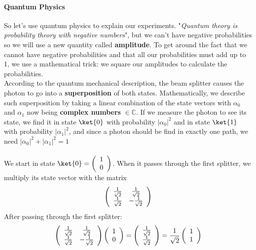 \documentclass[10pt]{report}
\begin{document}
\paragraph{Quantum Physics} So let's use quantum physics to explain our experiments. "\textit{Quantum theory is probability theory with negative numbers}", but we can't have negative probabilities so we will use a new quantity called \textbf{amplitude}. To get around the fact that we cannot have negative probabilities and that all our probabilities must add up to 1, we use a mathematical trick: we square our amplitudes to calculate the probabilities.\\
According to the quantum mechanical description, the beam splitter causes the photon to go into a \textbf{superposition} of both states. Mathematically, we describe such superposition by taking a linear combination of the state vectors with $\alpha_0$ and $\alpha_1$ now being \textbf{complex numbers} $\in \mathbb{C}$. If we measure the photon to see its state, we find it in state $\ket{0}$ with probability $|\alpha_0|^2$ and in state $\ket{1}$ with probability $|\alpha_1|^2$, and since a photon should be find in exactly one path, we need $|\alpha_0|^2+|\alpha_1|^2 = 1$\\\\
We start in state $\ket{0}=\left(\begin{array}{c}1\\0\end{array}\right)$. When it passes through the first splitter, we multiply its state vector with the matrix $$\left(\begin{array}{c c}
\frac{1}{\sqrt{2}}&\frac{1}{\sqrt{2}}\\\frac{1}{\sqrt{2}}&-\frac{1}{\sqrt{2}}
\end{array}\right)$$
After passing through the first splitter:
$$\left(\begin{array}{c c}
\frac{1}{\sqrt{2}}&\frac{1}{\sqrt{2}}\\\frac{1}{\sqrt{2}}&-\frac{1}{\sqrt{2}}
\end{array}\right)\left(\begin{array}{c}
1\\0
\end{array}\right) = \left(\begin{array}{c}
\frac{1}{\sqrt{2}}\\\frac{1}{\sqrt{2}}
\end{array}\right) = \frac{1}{\sqrt{2}}\left(\begin{array}{c}
1\\1
\end{array}\right)$$
\end{document}
